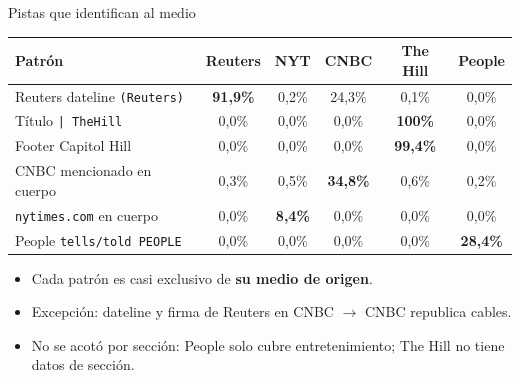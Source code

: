 \documentclass[10pt,aspectratio=169,table]{beamer}
\begin{document}
\begin{frame}{Pistas que identifican al medio}
  \footnotesize
  \begin{center}
  \begin{tabular}{lccccc}
    \toprule
    \textbf{Patrón} & \textbf{Reuters} & \textbf{NYT} & \textbf{CNBC} & \textbf{The Hill} & \textbf{People} \\
    \midrule
    Reuters dateline \texttt{(Reuters)} & \cellcolor{red!25}\textbf{91{,}9\%} & 0{,}2\% & \cellcolor{orange!25}24{,}3\% & 0{,}1\% & 0{,}0\% \\
    Título \texttt{| TheHill}           & 0{,}0\% & 0{,}0\% & 0{,}0\% & \cellcolor{red!25}\textbf{100\%}   & 0{,}0\% \\
    Footer Capitol Hill                 & 0{,}0\% & 0{,}0\% & 0{,}0\% & \cellcolor{red!25}\textbf{99{,}4\%} & 0{,}0\% \\
    CNBC mencionado en cuerpo           & 0{,}3\% & 0{,}5\% & \cellcolor{red!25}\textbf{34{,}8\%} & 0{,}6\% & 0{,}2\% \\
    \texttt{nytimes.com} en cuerpo      & 0{,}0\% & \cellcolor{red!25}\textbf{8{,}4\%}  & 0{,}0\% & 0{,}0\% & 0{,}0\% \\
    People \texttt{tells/told PEOPLE}   & 0{,}0\% & 0{,}0\% & 0{,}0\% & 0{,}0\% & \cellcolor{red!25}\textbf{28{,}4\%} \\
    \bottomrule
  \end{tabular}
  \end{center}
  \vspace{0.3em}
  \begin{itemize}\small
    \item Cada patrón es casi exclusivo de \textbf{su medio de origen}.
    \item Excepción: dateline y firma de Reuters en CNBC $\to$ CNBC republica cables.
    \item No se acotó por sección: People solo cubre entretenimiento; The Hill no tiene datos de sección.
  \end{itemize}
\end{frame}
\end{document}
